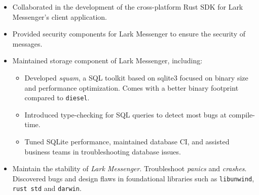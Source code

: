 \documentclass{resume}
\newcommand{\en}[1]{#1}
\newcommand{\zh}[1]{}
\begin{document}
\begin{itemize}
      \item \en{
                Collaborated in the development of the cross-platform Rust SDK for Lark Messenger's client application.
            }
            \zh{协作开发飞书客户端跨平台 Rust SDK。}
      \item \en{
                Provided security components for Lark Messenger to ensure the security of messages.
                }
            \zh{
                为飞书消息业务提供安全组件，确保消息的传输安全。
            }
      \item \en{
                Maintained storage component of Lark Messenger, including:
            }
            \zh{
                维护飞书 SDK 的存储组件，包括：
            }
      \begin{itemize}
                  \item \en{
                              Developed \textit{squam}, a SQL toolkit based on sqlite3 focused on binary size and performance optimization.
                              Comes with a better binary footprint compared to \texttt{diesel}.
                        }
                        \zh{
                              开发了基于 sqlite3 的 SQL 工具库 \textit{squam}，专注于优化二进制大小和性能。在测试中，相较于 \texttt{diesel}，\textit{squam} 的二进制体积更小，编译时间更短。
                        }
                  \item \en{
                              Introduced type-checking for SQL queries to detect most bugs at compile-time.
                        }
                        \zh{
                              引入了 SQL 查询语句的类型检查机制，在编译时能发现大部分 bug。
                        }
                  \item \en{
                              Tuned SQLite performance, maintained database CI, 
                              and assisted business teams in troubleshooting database issues.
                        }
                        \zh{
                              进行 sqlite 调优，维护数据库相关 CI，协助业务方排查数据库相关的问题。
                        }
            \end{itemize}
      \item \en{
                Maintain the stability of \textit{Lark Messenger}. Troubleshoot \textit{panics} and \textit{crashes}.
                Discovered bugs and design flaws in foundational libraries such as \texttt{libunwind}, \texttt{rust std} and \texttt{darwin}.
            }
            \zh{
                维护飞书客户端的稳定性，包括定位并修复 \textit{panic} 和 \textit{crash}。
                在定位过程中发现了 \texttt{libunwind}、\texttt{rust std} 和 \texttt{darwin} 等基础库的一些 bug 和设计缺陷。
            }
\end{itemize}
\end{document}
